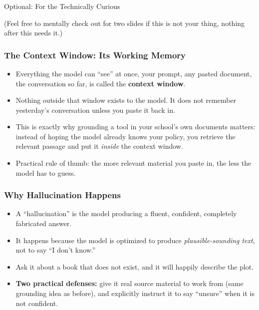 \begin{frame}[fragile]\frametitle{}
\begin{center}
{\Large Optional: For the Technically Curious}

\medskip
{\small (Feel free to mentally check out for two slides if this is not your thing, nothing after this needs it.)}
\end{center}
\end{frame}

\begin{frame}[fragile]\frametitle{The Context Window: Its Working Memory}
\begin{itemize}
\item Everything the model can ``see'' at once, your prompt, any pasted document, the conversation so far, is called the \textbf{context window}.
\item Nothing outside that window exists to the model. It does not remember yesterday's conversation unless you paste it back in.
\item This is exactly why grounding a tool in your school's own documents matters: instead of hoping the model already knows your policy, you retrieve the relevant passage and put it \emph{inside} the context window.
\item Practical rule of thumb: the more relevant material you paste in, the less the model has to guess.
\end{itemize}
\end{frame}

\begin{frame}[fragile]\frametitle{Why Hallucination Happens}
\begin{itemize}
\item A ``hallucination'' is the model producing a fluent, confident, completely fabricated answer.
\item It happens because the model is optimized to produce \emph{plausible-sounding text}, not to say ``I don't know.''
\item Ask it about a book that does not exist, and it will happily describe the plot.
\item \textbf{Two practical defenses:} give it real source material to work from (same grounding idea as before), and explicitly instruct it to say ``unsure'' when it is not confident.
\end{itemize}
\end{frame}
